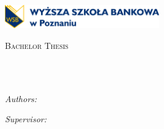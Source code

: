 \documentclass[
    11pt,
    english, %
    singlespacing, %
    headsepline, %
    oneside, %
]{MastersDoctoralThesis} %
\author{Petro Kolosov, Serhii Holishevskyi, Illia Zubachov, Arslanbek Temirbekov} %
\begin{document}
    \frontmatter %

    \pagestyle{plain} %


    \begin{titlepage}
        \begin{center}
            \includegraphics[width=0.5\textwidth]{Pictures/wsb_logo} \\ %
            \vspace*{.06\textheight}
            {\scshape\LARGE \univname\par}\vspace{1.5cm} %
            \textsc{\Large Bachelor Thesis}\\[0.5cm] %

            \HRule \\[0.4cm] %
            {\huge \bfseries \ttitle\par}\vspace{0.4cm}
            \HRule \\[1.5cm] %

            \begin{minipage}[t]{0.4\textwidth}
                \begin{flushleft}
                    \large
                    \emph{Authors:}\\
                    \authorname %
                \end{flushleft}
            \end{minipage}
            \begin{minipage}[t]{0.4\textwidth}
                \begin{flushright}
                    \large
                    \emph{Supervisor:} \\
                    \supname %
                \end{flushright}
            \end{minipage}\\[3cm]


\end{center}
\end{titlepage}
\end{document}
